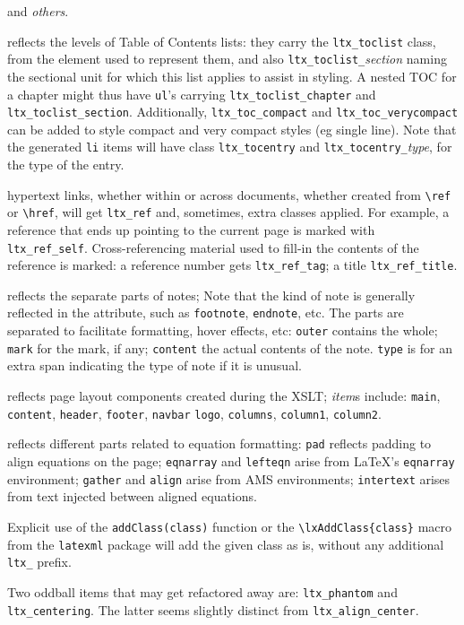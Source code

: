 \documentclass{book}
\begin{document}
\begin{description}
   and \emph{others}.
\item[\texttt{ltx\_toclist\_}\textit{type}, \texttt{ltx\_tocentry\_}\textit{type}]
  reflects the levels of Table of Contents lists:
  they carry the \texttt{ltx\_toclist} class, from the element used to represent them,
  and also \texttt{ltx\_toclist\_}\textit{section} naming the sectional unit for 
  which this list applies to assist in styling.  A nested TOC for a chapter might
  thus have \texttt{ul}'s carrying \texttt{ltx\_toclist\_chapter} and \texttt{ltx\_toclist\_section}.
  Additionally, \texttt{ltx\_toc\_compact} and \texttt{ltx\_toc\_verycompact} can
  be added to style compact and very compact styles (eg single line).
  Note that the generated \texttt{li} items will have class \texttt{ltx\_tocentry}
  and \texttt{ltx\_tocentry\_}\textit{type}, for the type of the entry.
\item[\texttt{ltx\_ref\_}\textit{item}]
  hypertext links, whether within or across documents, whether created from
  \verb|\ref| or \verb|\href|, will get \texttt{ltx\_ref} and, sometimes, extra classes applied.
  For example, a reference that ends up pointing to the current page is
  marked with \texttt{ltx\_ref\_self}.
  Cross-referencing material used to fill-in the contents of the reference is marked:
  a reference number gets \texttt{ltx\_ref\_tag}; a title \texttt{ltx\_ref\_title}.
\item[\texttt{ltx\_note\_}\textit{part}]
  reflects the separate parts of notes;
  Note that the kind of note is generally reflected in the  attribute,
  such as \texttt{footnote}, \texttt{endnote}, etc.
  The parts are separated to facilitate formatting, hover effects, etc:
  \texttt{outer} contains the whole; \texttt{mark} for the mark, if any;
  \texttt{content} the actual contents of the note.
  \texttt{type} is for an extra span indicating the type of note if it is unusual.
\item[\texttt{ltx\_page\_}\textit{item}]
  reflects page layout components created during the XSLT;
  \textit{item}s include:
   \texttt{main}, \texttt{content}, \texttt{header}, \texttt{footer}, \texttt{navbar}
   \texttt{logo}, \texttt{columns}, \texttt{column1}, \texttt{column2}.
\item[\texttt{ltx\_eqn\_}\textit{item}]
  reflects different parts related to equation formatting:
  \texttt{pad} reflects padding to align equations on the page;
  \texttt{eqnarray} and \texttt{lefteqn} arise from \LaTeX's \texttt{eqnarray} environment;
  \texttt{gather} and \texttt{align} arise from AMS environments;
  \texttt{intertext} arises from text injected between aligned equations.
\end{description}

Explicit use of the \verb|addClass(class)| function or
the \verb|\lxAddClass{class}| macro from the \texttt{latexml} package
will add the given class as is, without any additional \texttt{ltx\_} prefix.

Two oddball items that may get refactored away are:
\texttt{ltx\_phantom} and \texttt{ltx\_centering}.
The latter seems slightly distinct from \texttt{ltx\_align\_center}.
\backmatter
\printindex
\end{document}

